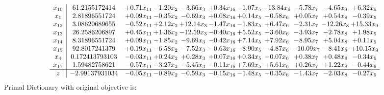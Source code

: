 \documentclass[9pt]{article}
\begin{document}
\[\begin{array}{c| c c@{\hskip 2pt} c@{\hskip 2pt} c@{\hskip 2pt} c@{\hskip 2pt} c@{\hskip 2pt} c@{\hskip 2pt} c@{\hskip 2pt} c@{\hskip 2pt} c@{\hskip 2pt} }
 x_{10}   &  61.2155172414 & +  0.71 x_{11} & -1.20 x_{2} & -3.66 x_{3} & +  0.34 x_{16} & -1.07 x_{5} & -13.84 x_{6} & -5.78 x_{7} & -4.65 x_{8} & +  6.32 x_{9}\\
 x_{1}   &  2.81896551724 & +  0.09 x_{11} & -0.35 x_{2} & -0.69 x_{3} & +  0.08 x_{16} & +  0.14 x_{5} & -0.58 x_{6} & +  0.05 x_{7} & +  0.54 x_{8} & -0.39 x_{9}\\
 x_{12}   &  3.08620689655 & -0.52 x_{11} & +  2.12 x_{2} & + 12.14 x_{3} & -1.47 x_{16} & -1.83 x_{5} & +  6.47 x_{6} & -2.31 x_{7} & -12.26 x_{8} & + 15.33 x_{9}\\
 x_{13}   &  26.2586206897 & +  0.45 x_{11} & +  1.36 x_{2} & -12.59 x_{3} & -0.40 x_{16} & +  5.52 x_{5} & -3.60 x_{6} & -3.93 x_{7} & -2.78 x_{8} & +  1.98 x_{9}\\
 x_{14}   &  8.31896551724 & +  0.09 x_{11} & -1.85 x_{2} & -9.69 x_{3} & -0.42 x_{16} & +  7.14 x_{5} & +  7.92 x_{6} & -8.95 x_{7} & +  5.04 x_{8} & +  0.11 x_{9}\\
 x_{15}   &  92.8017241379 & +  0.19 x_{11} & -6.58 x_{2} & -7.52 x_{3} & -0.63 x_{16} & -8.90 x_{5} & -4.87 x_{6} & -10.09 x_{7} & -8.41 x_{8} & + 10.15 x_{9}\\
 x_{4}   &  0.172413793103 & -0.03 x_{11} & +  0.24 x_{2} & +  0.28 x_{3} & +  0.07 x_{16} & +  0.34 x_{5} & -0.07 x_{6} & +  0.38 x_{7} & +  0.48 x_{8} & -0.34 x_{9}\\
 x_{17}   &  1.59482758621 & -0.57 x_{11} & -3.27 x_{2} & -5.45 x_{3} & -0.11 x_{16} & +  7.69 x_{5} & +  5.61 x_{6} & +  0.26 x_{7} & +  1.22 x_{8} & -0.44 x_{9}\\
\hline
z    &  -2.99137931034 & -0.05 x_{11} & -0.89 x_{2} & -0.59 x_{3} & -0.15 x_{16} & -1.48 x_{5} & -0.35 x_{6} & -1.43 x_{7} & -2.03 x_{8} & -0.27 x_{9}\\
\end{array}\]
Primal Dictionary with original objective is:
\end{document}
